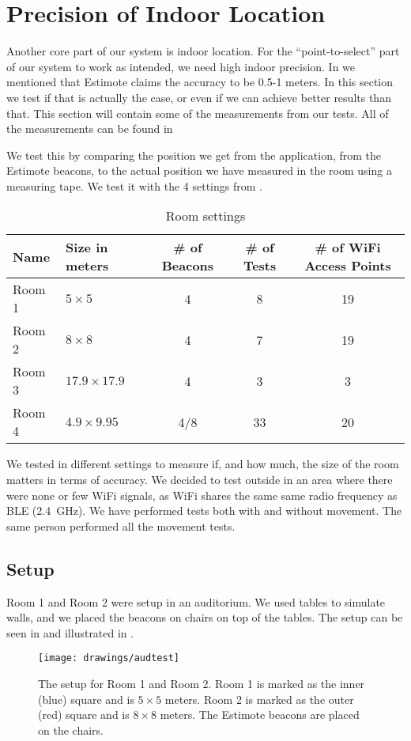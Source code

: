 \section{Precision of Indoor Location}\label{sec:estimoteprecision}
Another core part of our system is indoor location. 
For the ``point-to-select'' part of our system to work as intended, 
we need high indoor precision. 
In  we mentioned that Estimote claims the accuracy to be \num{0.5}-\num{1} meters.
In this section we test if that is actually the case, 
or even if we can achieve better results than that. 
This section will contain some of the measurements from our tests. 
All of the measurements can be found in 

We test this by comparing the position we get from the application, \ie from the Estimote beacons,
to the actual position we have measured in the room using a measuring tape.
We test it with the \num{4} settings from .

\begin{table}
  \centering
  \begin{tabular}{l| l c c c}
    Name & Size in meters & \# of Beacons & \# of Tests & \# of WiFi Access Points\\ \hline
    Room 1 & $5 \times 5$ & 4 & 8 & 19 \\
    Room 2 & $8 \times 8$ & 4 & 7 & 19 \\
    Room 3 & $17.9 \times 17.9$ & 4 & 3 & 3\\
    Room 4 & $4.9 \times 9.95$ & 4/8 & 33 & 20 
  \end{tabular}
  \caption{Room settings}
  \label{table:rooms}
\end{table}

We tested in different settings to measure if, and how much, 
the size of the room matters in terms of accuracy. 
We decided to test outside in an area where there were none or few WiFi signals,
as WiFi shares the same same radio frequency as BLE (\SI{2.4}{\GHz}). 
We have performed tests both with and without movement. 
The same person performed all the movement tests. 

\subsection{Setup}\label{sec:setup}
Room 1 and Room 2 were setup in an auditorium. 
We used tables to simulate walls, 
and we placed the beacons on chairs on top of the tables. 
The setup can be seen in  and illustrated in . 
\begin{figure}[!htb]
  \centering
  \texttt{[image: drawings/audtest]}
  \caption{The setup for Room 1 and Room 2. Room 1 is marked as the inner (blue) square and is $5 \times 5$ meters. Room 2 is marked as the outer (red) square and is $8 \times 8$ meters. The Estimote beacons are placed on the chairs.}
  \label{fig:audtest}
\end{figure}

